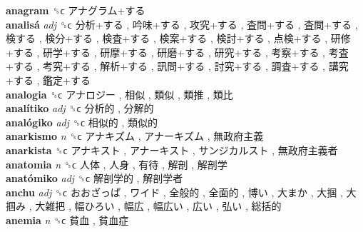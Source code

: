 \textbf{anagram} ␝ϲ   アナグラム+する   \\
\textbf{analisá} \emph{adj}  ␝ϲ   分析+する ,  吟味+する ,  攻究+する ,  査問+する ,  査閲+する ,  検する ,  検分+する ,  検査+する ,  検案+する ,  検討+する ,  点検+する ,  研修+する ,  研学+する ,  研摩+する ,  研磨+する ,  研究+する ,  考察+する ,  考査+する ,  考究+する ,  解析+する ,  訊問+する ,  討究+する ,  調査+する ,  講究+する ,  鑑定+する   \\
\textbf{analogia} ␝ϲ   アナロジー ,  相似 ,  類似 ,  類推 ,  類比   \\
\textbf{analítiko} \emph{adj}  ␝ϲ   分析的 ,  分解的   \\
\textbf{analógiko} \emph{adj}  ␝ϲ   相似的 ,  類似的   \\
\textbf{anarkismo} \emph{n}  ␝ϲ   アナキズム ,  アナーキズム ,  無政府主義   \\
\textbf{anarkista} ␝ϲ   アナキスト ,  アナーキスト ,  サンジカルスト ,  無政府主義者   \\
\textbf{anatomia} \emph{n}  ␝ϲ   人体 ,  人身 ,  有待 ,  解剖 ,  解剖学   \\
\textbf{anatómiko} \emph{adj}  ␝ϲ   解剖学的 ,  解剖学者   \\
\textbf{anchu} \emph{adj}  ␝ϲ   おおざっぱ ,  ワイド ,  全般的 ,  全面的 ,  博い ,  大まか ,  大掴 ,  大掴み ,  大雑把 ,  幅ひろい ,  幅広 ,  幅広い ,  広い ,  弘い ,  総括的   \\
\textbf{anemia} \emph{n}  ␝ϲ   貧血 ,  貧血症   \\
